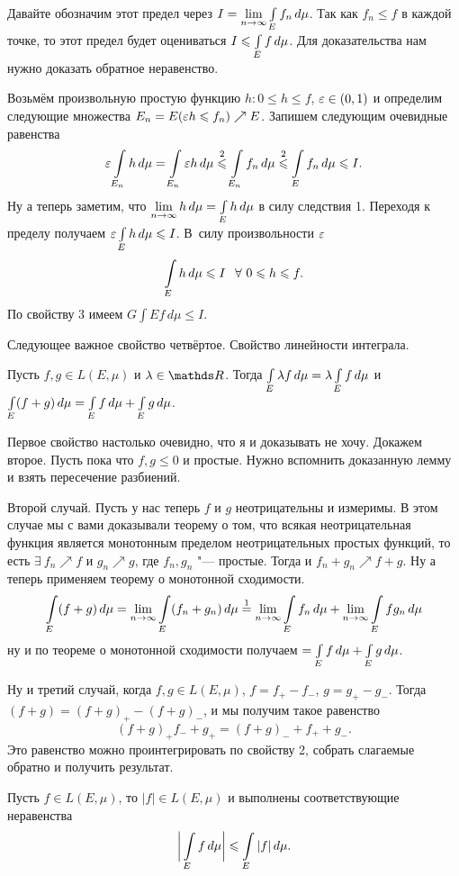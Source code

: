 \begin{Proof}
  Давайте обозначим этот предел через $I = \lim\limits_{n\rightarrow\infty}\int\limits_{E}f_n\,d\mu$. Так как $f_n\le f$ в каждой точке, то этот предел будет оцениваться $I\leqslant \int\limits_{E}f\,d\mu$. Для доказательства нам нужно доказать обратное неравенство.

  Возьмём произвольную простую функцию $h\colon 0\le h\le f$, $\varepsilon\in(0,1)$ и определим следующие множества $E_n = E(\varepsilon h\leqslant f_n)\nearrow E$. Запишем следующим очевидные равенства
  \[
    \varepsilon\int\limits_{E_n}h\,d\mu = \int\limits_{E_n}\varepsilon h\,d\mu\overset2{\leqslant} \int\limits_{E_n}f_n\,d\mu\overset2{\leqslant}\int\limits_{E} f_n\,d\mu\leqslant I.
  \]
Ну а теперь заметим, что $\lim\limits_{n\rightarrow\infty} h\,d\mu = \int\limits_{E} h\,d\mu$ в силу следствия 1. Переходя к пределу получаем $\varepsilon\int\limits_{E}h\,d\mu\leqslant I$. В~силу произвольности $\varepsilon$
 \[
  \Gint Eh\,d\mu\le I\pau \forall\ 0\le h\le f.
 \]
 По свойству 3 имеем $G\int Ef\,d\mu\le I$.
\end{Proof}


Следующее важное свойство четвёртое. Свойство линейности интеграла.
\begin{Ut}
  Пусть $f,g\in L(E,\mu)$ и $\lambda\in\R$. Тогда $\int\limits_{E}\lambda f\,d\mu = \lambda\int\limits_{E}f\,d\mu$ и $\int\limits_{E}(f+g)\,d\mu = \int\limits_{E} f\,d\mu+\int\limits_{E}g\,d\mu$.
\end{Ut}
\begin{Proof}
  Первое свойство настолько очевидно, что я и доказывать не хочу. Докажем второе. Пусть пока что $f,g\le 0$ и простые. Нужно вспомнить доказанную лемму и взять пересечение разбиений.

Второй случай. Пусть у нас теперь $f$ и $g$ неотрицательны и измеримы. В этом случае мы с вами доказывали теорему о том, что всякая неотрицательная функция является монотонным пределом неотрицательных простых функций, то есть $\exists\ f_n\nearrow f$ и $g_n\nearrow g$, где $f_n,g_n$ "--- простые. Тогда и $f_n+g_n\nearrow f+g$. Ну а теперь применяем теорему о монотонной сходимости.
 \[
  \int\limits_{E}(f+g)\,d\mu = \lim\limits_{n\rightarrow\infty}\int\limits_{E}(f_n+g_n)\,d\mu \overset1= \lim\limits_{n\rightarrow\infty}\int\limits_{E}f_n\,d\mu+\lim\limits_{n\rightarrow\infty}\int\limits_{E}fg_n\,d\mu
\]
ну и по теореме о монотонной сходимости получаем $=\int\limits_{E}f\,d\mu+\int\limits_{E}g\,d\mu$.

Ну и третий случай, когда $f,g\in L(E,\mu)$, $f=f_+-f_-$, $g=g_+-g_-$. Тогда $(f+g) = (f+g)_+-(f+g)_-$, и мы получим такое равенство
 \[
   (f+g)_+f_-+g_+ = (f+g)_-+f_++g_-.
 \]
Это равенство можно проинтегрировать по свойству 2, собрать слагаемые обратно и получить результат.
\end{Proof}

\begin{Ut}
  Пусть $f\in L(E,\mu)$, то $|f|\in L(E,\mu)$ и выполнены соответствующие неравенства
  \[
    \bigg|\int\limits_{E}f\,d\mu\bigg|\leqslant \int\limits_{E}|f|\,d\mu.
  \]
\end{Ut}

